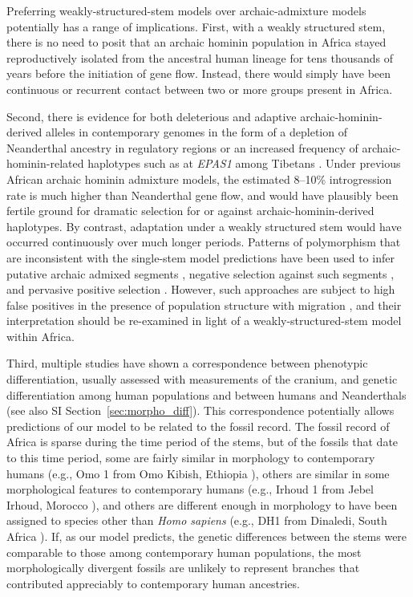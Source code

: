 \documentclass[]{article}
\begin{document}
Preferring weakly-structured-stem models over archaic-admixture models
potentially has a range of implications. First, with a weakly structured stem,
there is no need to posit that an archaic hominin population in Africa stayed
reproductively isolated from the ancestral human lineage for tens thousands of
years before the initiation of gene flow. Instead, there would simply have
been continuous or recurrent contact between two or more groups present in
Africa. 

Second, there is evidence for both deleterious and adaptive
archaic-hominin-derived alleles in contemporary genomes in the form of a
depletion of Neanderthal ancestry in regulatory regions \citep{Petr2019-xo} or
an increased frequency of archaic-hominin-related haplotypes such as at
\emph{EPAS1} among Tibetans \citep{Zhang2021-xx}. Under previous African
archaic hominin admixture models, the estimated 8--10\% introgression rate is
much higher than Neanderthal gene flow, and would have plausibly been fertile
ground for dramatic selection for or against archaic-hominin-derived
haplotypes\citep{Wall2019-ao}. By contrast, adaptation under a weakly
structured stem would have occurred continuously over much longer periods.
Patterns of polymorphism that are inconsistent with the single-stem model
predictions have been used to infer putative archaic admixed segments
\citep{Plagnol2006-lt,Hsieh2016-gk,Wall2019-ao,Durvasula2020-td}, negative
selection against such segments \citep{Wall2019-ao}, and pervasive positive
selection \citep{Schrider2017-kl}. However, such approaches are subject to high
false positives in the presence of population structure with migration
\citep{Petr2019-xo}, and their interpretation should be re-examined in light of
a weakly-structured-stem model within Africa. 

Third, multiple studies have shown a correspondence between phenotypic
differentiation, usually assessed with measurements of the cranium, and genetic
differentiation among human populations and between humans and Neanderthals
\citep{Relethford1994-mh,Weaver2008-ho,Von_Cramon-Taubadel2009-zb} (see also SI
Section~\ref{sec:morpho_diff}). This correspondence potentially allows
predictions of our model to be related to the fossil record. The fossil record
of Africa is sparse during the time period of the stems, but of the fossils
that date to this time period, some are fairly similar in morphology to
contemporary humans (e.g., Omo 1 from Omo Kibish, Ethiopia
\citep{Day1969-rh,Vidal2022-qe}), others are similar in some morphological
features to contemporary humans (e.g., Irhoud 1 from Jebel Irhoud, Morocco
\citep{Hublin2017-cq,Richter2017-zu}), and others are different enough in
morphology to have been assigned to species other than \emph{Homo sapiens}
(e.g., DH1 from Dinaledi, South Africa \citep{Berger2015-bq,Dirks2017-uk}). If,
as our model predicts, the genetic differences between the stems were
comparable to those among contemporary human populations, the most
morphologically divergent fossils are unlikely to represent branches that
contributed appreciably to contemporary human ancestries.
\end{document}
